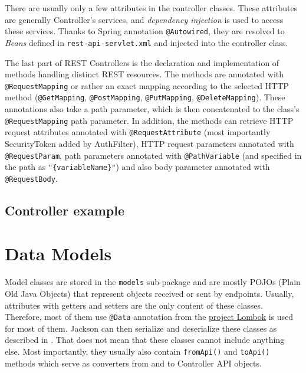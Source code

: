 There are usually only a few attributes in the controller classes. These attributes are generally Controller’s services, and \emph{dependency injection} is used to access these services. Thanks to Spring annotation \texttt{@Autowired}, they are resolved to \emph{Beans} defined in \texttt{rest-api-servlet.xml} and injected into the controller class.

The last part of REST Controllers is the declaration and implementation of methods handling distinct REST resources. The methods are annotated with \texttt{@RequestMapping} or rather an exact mapping according to the selected HTTP method (\texttt{@GetMapping}, \texttt{@PostMapping}, \texttt{@PutMapping}, \texttt{@DeleteMapping}).
These annotations also take a path parameter, which is then concatenated to the class’s \texttt{@RequestMapping} path parameter.
In addition, the methods can retrieve HTTP request attributes annotated with \texttt{@RequestAttribute} (most importantly SecurityToken added by AuthFilter), HTTP request parameters annotated with \texttt{@RequestParam}, path parameters annotated with \texttt{@PathVariable} (and specified in the path as \texttt{"\{variableName\}"}) and also body parameter annotated with \texttt{@RequestBody}.

\subsection{Controller example}


\section{Data Models}
Model classes are stored in the \texttt{models} sub-package and are mostly POJOs (Plain Old Java Objects) that represent objects received or sent by endpoints. Usually, attributes with getters and setters are the only content of these classes. Therefore, most of them use \texttt{@Data} annotation from the \hyperref[sec:lombok]{project Lombok} is used for most of them. Jackson can then serialize and deserialize these classes as described in .
That does not mean that these classes cannot include anything else. Most importantly, they usually also contain \texttt{fromApi()} and \texttt{toApi()} methods which serve as converters from and to Controller API objects.

